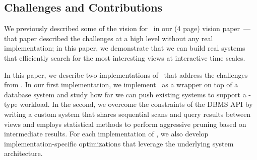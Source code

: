 \subsection*{Challenges and Contributions}

We previously described some of the vision for  \VizRecDB\ in our (4 page)
vision paper~\cite{DBLP:conf/vldb/Parameswaran2013}---that paper described the
challenges at a high level without any real implementation; in this paper, we
demonstrate that we can build real systems that efficiently search for the most
interesting views at interactive time scales.

In this paper, we describe two implementations of \VizRecDB\ that address the
challenges from \cite{DBLP:conf/vldb/Parameswaran2013}.
In our first implementation, we implement \VizRecDB\ as a wrapper on top of a
database system and study how far we can push existing systems to support a
\VizRecDB-type workload.
In the second, we overcome the constraints of the DBMS API by writing a custom system
that  shares sequential scans and query results between views and employs statistical methods to 
perform aggressive pruning
based on intermediate results.
For each implementation of \VizRecDB, we also develop implementation-specific
optimizations that leverage the underlying system architecture.


